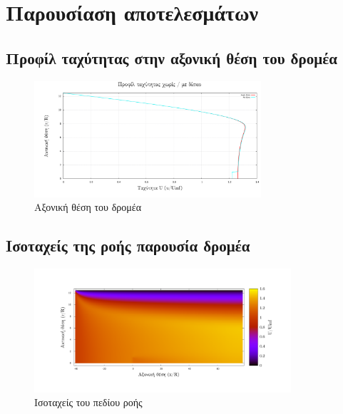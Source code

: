 \section{Παρουσίαση αποτελεσμάτων}

\subsection{Προφίλ ταχύτητας στην αξονική θέση του δρομέα}

\begin{figure}[h!]
    \begin{center}
        \includegraphics[width=0.75\textwidth]{figures/x0_prof.pdf}
    \end{center}
    \caption{Αξονική θέση του δρομέα}
    \label{fig:x0prof}
\end{figure}

\newpage
\subsection{Ισοταχείς της ροής παρουσία δρομέα}

\begin{figure}[h!]
    \begin{center}
        \includegraphics[width=0.85\textwidth]{figures/isoU.pdf}
    \end{center}
    \caption{Ισοταχείς του πεδίου ροής}
    \label{fig:isoU}
\end{figure}

